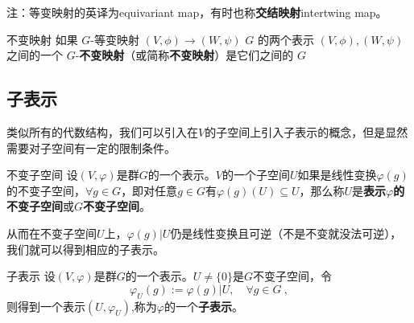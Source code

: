 注：等变映射的英译为equivariant map，有时也称\textbf{交结映射}intertwing map。

\begin{definition}{不变映射}
如果 $G$-等变映射 $(V, \phi) \to (W, \psi)$
$G$ 的两个表示 $(V, \phi), (W, \psi)$ 之间的一个 $G$-\textbf{不变映射}（或简称\textbf{不变映射}）是它们之间的 $G$

\end{definition}


\subsection{子表示}


类似所有的代数结构，我们可以引入在$V$的子空间上引入子表示的概念，但是显然需要对子空间有一定的限制条件。

\begin{definition}{不变子空间}
设$(V,\varphi)$是群$G$的一个表示。$V$的一个子空间$U$如果是线性变换$\varphi(g)$的不变子空间，$\forall g\in G$，即对任意$g\in G$有$\varphi(g)(U)\subseteq U$，那么称$U$是\textbf{表示$\varphi$的不变子空间}或\textbf{$G$不变子空间}。
\end{definition}

从而在不变子空间$U$上，$\varphi(g)|U$仍是线性变换且可逆（不是不变就没法可逆），我们就可以得到相应的子表示。

\begin{definition}{子表示}
设$(V,\varphi)$是群$G$的一个表示。$U\neq\{0\}$是$G$不变子空间，令
\begin{equation}
\varphi_U(g) := \varphi(g)|U,\quad\forall g\in G~,
\end{equation}
则得到一个表示$(U,\varphi_U)$,称为$\varphi$的一个\textbf{子表示}。
\end{definition}
